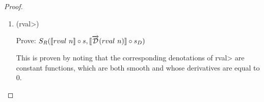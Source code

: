 \documentclass[11pt, final]{article}
\begin{document}
\begin{proof}
\begin{enumerate}
        Assume:
        \begin{enumerate}
          \item $f_1 : R \rightarrow \llbracket \sigma \rrbracket$
          \item $f_2 : R \rightarrow \llbracket \D(\sigma) \rrbracket$
          \item \label{eqn:subst_ass_abs3} $S_\sigma(f_1, f_2)$
        \end{enumerate}

        The proof proceeds by rewriting the goal until we can apply the induction hypothesis.
        Note that the assumption \ref{eqn:subst_ass_abs3}: $S_\sigma(f_1, f_2)$ ensures that the requirement of $inst_{\sigma::\Gamma}$ in the induction hypothesis \ref{eqn:subst_ih_abs} is satisfied.

        \begin{align*}
          S&_{\tau}(\lambda x. (\llbracket abs\ t \rrbracket (s(x)))(f_1(x)), \lambda x. (\llbracket \D(abs\ t) \rrbracket (s_D(x)))(f_2(x))) \\
            &\Vdash \text{(Definition of $\D$)}\\
            & S_{\tau}(\lambda x. (\llbracket abs\ t \rrbracket (s(x)))(f_1(x)), \lambda x. (\llbracket abs\ \D(t) \rrbracket (s_D(x)))(f_2(x))) \\
            &\Vdash \text{(Definition of $\llbracket \rrbracket$)}\\
            & S_{\tau}(\lambda x. (\llbracket t \rrbracket (f_1(x) :: s(x))), \lambda x. (\llbracket \D(t) \rrbracket (f_2(x) :: s_D(x)))) \\
            &\Vdash \text{(Induction hypothesis \ref{eqn:subst_ih_app1})}
        \end{align*} \qed

      \item (\<rval>)

      Prove: $S_{R}(\llbracket rval\ n \rrbracket \circ s, \llbracket \overrightarrow{\mathcal{D}}(rval\ n) \rrbracket \circ s_D)$

      This is proven by noting that the corresponding denotations of \<rval> are constant functions, which are both smooth and whose derivatives are equal to $0$.


\end{enumerate}
\end{proof}
\end{document}
